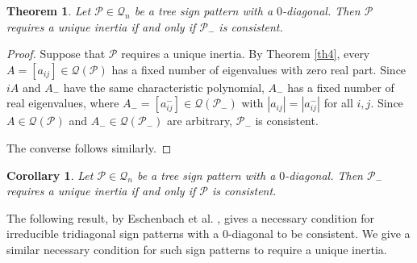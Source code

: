 \documentclass[10pt,a4paper]{amsart}
\newtheorem{theorem}{Theorem}[section]
\newtheorem{cor}{Corollary}[section]
\numberwithin{equation}{section}
\begin{document}
	
	\begin{theorem} \label{th2.3}
		Let $\mathcal{P}\in \mathcal{Q}_n$ be a tree sign pattern with a $0$-diagonal. Then $\mathcal{P}$ requires a unique inertia if and only if $\mathcal{P}_-$ is consistent.
	\end{theorem}
	\begin{proof}
		Suppose that $\mathcal{P}$ requires a unique inertia. By Theorem \ref{th4}, every $A=[a_{ij}]\in \mathcal{Q}(\mathcal{P})$ has a fixed number of eigenvalues with zero real part.  Since $iA$ and $A_-$ have the same characteristic polynomial, $A_-$ has a fixed number of real eigenvalues, where $A_-=[a^-_{ij}]\in \mathcal{Q}(\mathcal{P_-})$ with $|a_{ij}|=|a^-_{ij}|$ for all $i,j$. Since $A\in \mathcal{Q}(\mathcal{P})$ and $A_- \in \mathcal{Q}(\mathcal{P_-})$ are arbitrary, $\mathcal{P}_-$ is consistent.
		
		The converse follows similarly.
	\end{proof}
	
		
	\begin{cor}\label{c2.2}
		Let $\mathcal{P}\in \mathcal{Q}_n$ be a tree sign pattern with a $0$-diagonal. Then $\mathcal{P}_-$ requires a unique inertia if and only if $\mathcal{P}$ is consistent.
	\end{cor}
	
	
	
	
	
	
	The following result, by Eschenbach et al. \cite{1}, gives a necessary condition for irreducible tridiagonal sign patterns with a $0$-diagonal to be consistent. We give a similar necessary condition for such sign patterns to require a unique inertia.
	
\end{document}
